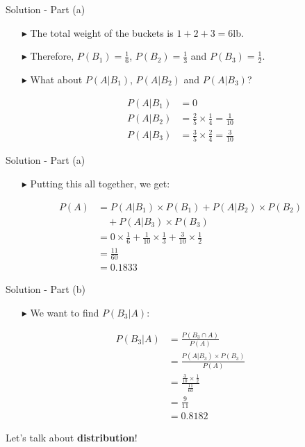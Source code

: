 \documentclass[12pt]{beamer}
\begin{document}
\begin{frame}{Solution - Part (a)}
\begin{itemize}
	\item[\color{blue}$\blacktriangleright$] The total weight of the buckets is $1 + 2 + 3 = 6$lb.
	\item[\color{blue}$\blacktriangleright$] Therefore, $P(B_1) = \frac{1}{6}$, $P(B_2) = \frac{1}{3}$ and $P(B_3) = \frac{1}{2}$.
	\item[\color{blue}$\blacktriangleright$] What about $P(A|B_1)$, $P(A|B_2)$ and $P(A|B_3)$?
\end{itemize}

\begin{align*}
	P(A|B_1) &= 0 \\[6pt]
	P(A|B_2) &= \frac{2}{5} \times \frac{1}{4} = \frac{1}{10} \\[6pt]
	P(A|B_3) &= \frac{3}{5} \times \frac{2}{4} = \frac{3}{10}
\end{align*}
\end{frame}

\begin{frame}{Solution - Part (a)}
\begin{itemize}
	\item[\color{blue}$\blacktriangleright$] Putting this all together, we get:
\end{itemize}

\begin{align*}
	P(A) &= P(A|B_1) \times P(B_1) + P(A|B_2) \times P(B_2) \\
	&\quad + P(A|B_3) \times P(B_3) \\[10pt]
	&= 0 \times \frac{1}{6} + \frac{1}{10} \times \frac{1}{3} + \frac{3}{10} \times \frac{1}{2} \\[10pt]
	&= \frac{11}{60} \\[10pt]
	&= 0.1833
\end{align*}
\end{frame}

\begin{frame}{Solution - Part (b)}
	
\begin{itemize}
	\item[\color{blue}$\blacktriangleright$] We want to find $P(B_3|A)$:
\end{itemize}

\begin{align*}
	P(B_3|A) &= \frac{P(B_3 \cap A)}{P(A)} \\[10pt]
	&= \frac{P(A|B_3) \times P(B_3)}{P(A)} \\[10pt]
	&= \frac{\frac{3}{10} \times \frac{1}{2}}{\frac{11}{60}} \\[10pt]
	&= \frac{9}{11} \\[10pt]
	&= 0.8182
\end{align*}

\end{frame}
\begin{frame}{}
	
Let's talk about {\bf distribution}!
	
\end{frame}
\end{document}
